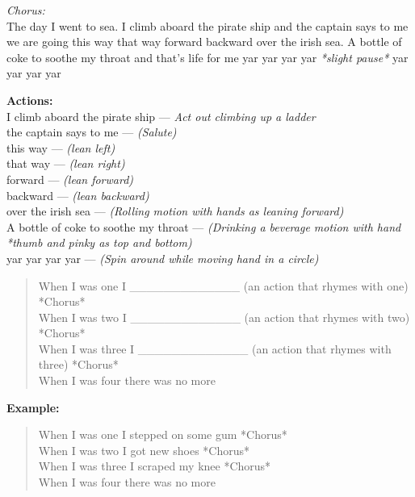 
\begin{center}
\textit{Chorus:} \\
The day I went to sea. I climb aboard the pirate ship and the captain says to me we are going this way that way forward backward over the irish sea. A bottle of coke to soothe my throat and that's life for me yar yar yar yar \textit{*slight pause*} yar yar yar yar
\end{center}

\textbf{Actions:} \\
I climb aboard the pirate ship --- \textit{Act out climbing up a ladder} \\
the captain says to me --- \textit{(Salute)} \\
this way --- \textit{(lean left)} \\
that way --- \textit{(lean right)} \\
forward --- \textit{(lean forward)} \\
backward --- \textit{(lean backward)} \\
over the irish sea --- \textit{(Rolling motion with hands as leaning forward)} \\
A bottle of coke to soothe my throat --- \textit{(Drinking a beverage motion with hand *thumb and pinky as top and bottom)} \\
yar yar yar yar --- \textit{(Spin around while moving hand in a circle)} \\

\begin{verse}
When I was one I \_\_\_\_\_\_\_\_\_\_\_\_\_ (an action that rhymes with one) *Chorus* \\

When I was two I \_\_\_\_\_\_\_\_\_\_\_\_\_ (an action that rhymes with two) *Chorus* \\

When I was three I \_\_\_\_\_\_\_\_\_\_\_\_\_ (an action that rhymes with three) *Chorus* \\

When I was four there was no more \\
\end{verse}

\textbf{Example:}

\begin{verse}
When I was one I stepped on some gum *Chorus* \\

When I was two I got new shoes *Chorus* \\

When I was three I scraped my knee *Chorus* \\

When I was four there was no more \\
\end{verse}
